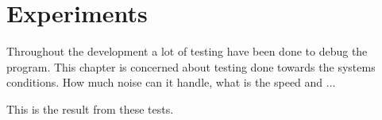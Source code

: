 \chapter{Experiments}\label{chap:experiments}
Throughout the development a lot of testing have been done to debug the program. This chapter is concerned about testing done towards the systems conditions. How much noise can it handle, what is the speed and ... 

This is the result from these tests.
